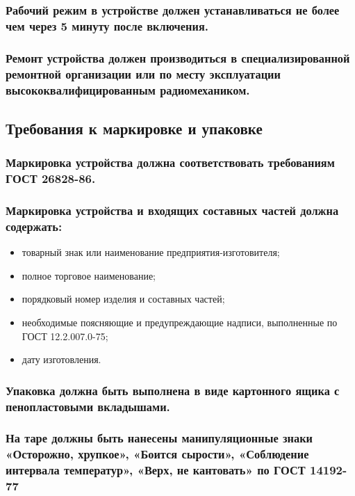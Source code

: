 \documentclass[a4paper]{bsuir-tor}
\begin{document}
\subsubsection{Рабочий режим в устройстве должен устанавливаться не
более чем через 5 минуту после включения.}

\subsubsection{Ремонт устройства должен производиться в
  специализированной ремонтной организации или по месту эксплуатации
  высококвалифицированным радиомехаником.}

\subsection{Требования к маркировке и упаковке}

\subsubsection{Маркировка устройства должна соответствовать
  требованиям ГОСТ 26828-86.}

\subsubsection{Маркировка устройства и входящих составных частей должна содержать:}
\begin{itemize}
\item товарный знак или наименование предприятия-изготовителя;
\item полное торговое наименование;  
\item порядковый номер изделия и составных частей;
\item необходимые поясняющие и предупреждающие надписи,
  выполненные по ГОСТ 12.2.007.0-75;
\item дату изготовления.
\end{itemize}

\subsubsection{Упаковка должна быть выполнена в виде картонного ящика
  с пенопластовыми вкладышами.}

\subsubsection{На таре должны быть нанесены манипуляционные знаки
  «Осторожно, хрупкое»,
  «Боится сырости»,
  «Соблюдение интервала температур», «Верх, не кантовать» по ГОСТ 14192-77}
\end{document}
